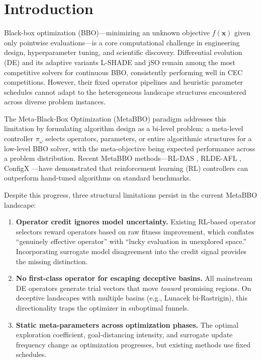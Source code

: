\documentclass[preprint,12pt,authoryear]{elsarticle}
\begin{document}
\section{Introduction}
\label{sec:intro}

Black-box optimization (BBO)---minimizing an unknown objective $f(\mathbf{x})$ given only pointwise evaluations---is a core computational challenge in engineering design, hyperparameter tuning, and scientific discovery. Differential evolution (DE) \citep{Storn1997} and its adaptive variants L-SHADE \citep{Tanabe2014} and jSO \citep{Brest2017} remain among the most competitive solvers for continuous BBO, consistently performing well in CEC competitions. However, their fixed operator pipelines and heuristic parameter schedules cannot adapt to the heterogeneous landscape structures encountered across diverse problem instances.

The Meta-Black-Box Optimization (MetaBBO) paradigm \citep{Ma2025survey} addresses this limitation by formulating algorithm design as a bi-level problem: a meta-level controller $\pi_\omega$ selects operators, parameters, or entire algorithmic structures for a low-level BBO solver, with the meta-objective being expected performance across a problem distribution. Recent MetaBBO methods---RL-DAS \citep{Guo2024}, RLDE-AFL \citep{Guo2025}, ConfigX \citep{Guo2024configx}---have demonstrated that reinforcement learning (RL) controllers can outperform hand-tuned algorithms on standard benchmarks.

Despite this progress, three structural limitations persist in the current MetaBBO landscape:

\begin{enumerate}
\item \textbf{Operator credit ignores model uncertainty.} Existing RL-based operator selectors reward operators based on raw fitness improvement, which conflates ``genuinely effective operator'' with ``lucky evaluation in unexplored space.'' Incorporating surrogate model disagreement into the credit signal provides the missing distinction.

\item \textbf{No first-class operator for escaping deceptive basins.} All mainstream DE operators generate trial vectors that move \emph{toward} promising regions. On deceptive landscapes with multiple basins (e.g., Lunacek bi-Rastrigin), this directionality traps the optimizer in suboptimal funnels.

\item \textbf{Static meta-parameters across optimization phases.} The optimal exploration coefficient, goal-distancing intensity, and surrogate update frequency change as optimization progresses, but existing methods use fixed schedules.
\end{enumerate}
\end{document}
